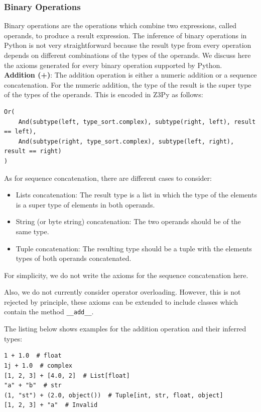 \subsubsection{Binary Operations}
Binary operations are the operations which combine two expressions, called operands, to produce a result expression. The inference of binary operations in Python is not very straightforward because the result type from every operation depends on different combinations of the types of the operands. We discuss here the axioms generated for every binary operation supported by Python.\\

\textbf{Addition (+)}:
The addition operation is either a numeric addition or a sequence concatenation. For the numeric addition, the type of the result is the super type of the types of the operands. This is encoded in Z3Py as follows:

\begin{lstlisting}
Or(
	And(subtype(left, type_sort.complex), subtype(right, left), result == left),
	And(subtype(right, type_sort.complex), subtype(left, right), result == right)
)
\end{lstlisting}

As for sequence concatenation, there are different cases to consider:

\begin{itemize}
	\item Lists concatenation: The result type is a list in which the type of the elements is a super type of elements in both operands.
	\item String (or byte string) concatenation: The two operands should be of the same type.
	\item Tuple concatenation: The resulting type should be a tuple with the elements types of both operands concatenated.
\end{itemize}

For simplicity, we do not write the axioms for the sequence concatenation here.

Also, we do not currently consider operator overloading. However, this is not rejected by principle, these axioms can be extended to include classes which contain the method \lstinline|__add__|.

The listing below shows examples for the addition operation and their inferred types:

\begin{lstlisting}
1 + 1.0  # float
1j + 1.0  # complex
[1, 2, 3] + [4.0, 2]  # List[float]
"a" + "b"  # str
(1, "st") + (2.0, object())  # Tuple[int, str, float, object]
[1, 2, 3] + "a"  # Invalid
\end{lstlisting}

